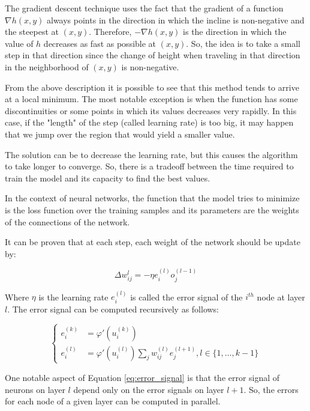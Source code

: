 The gradient descent technique uses the fact that the gradient of a function $\nabla h(x, y)$ always points in the direction in which the incline is non-negative and the steepest at $(x, y)$.
Therefore, $-\nabla h(x,y)$ is the direction in which the value of $h$ decreases as fast as possible at $(x, y)$.
So, the idea is to take a small step in that direction since the change of height when traveling in that direction in the neighborhood of $(x, y)$ is non-negative.

From the above description it is possible to see that this method tends to arrive at a local minimum.
The most notable exception is when the function has some discontinuities or some points in which its values decreases very rapidly.
In this case, if the "length" of the step (called learning rate) is too big, it may happen that we jump over the region that would yield a smaller value.

The solution can be to decrease the learning rate, but this causes the algorithm to take longer to converge.
So, there is a tradeoff between the time required to train the model and its capacity to find the best values.

In the context of neural networks, the function that the model tries to minimize is the loss function over the training samples and its parameters are the weights of the connections of the network.

It can be proven \cite{amari1993backpropagation} that at each step, each weight of the network should be update by:


$$
\Delta w_{ij}^{l} = -\eta e_i^{(l)} o_{j}^{(l-1)}
$$

Where $\eta$ is the learning rate $e_i^{(l)}$ is called the error signal of the $i^{th}$ node at layer $l$.
The error signal can be computed recursively as follows:

\begin{equation}\label{eq:error_signal}
\begin{cases}
    e_i^{(k)} &= \varphi '(u_i^{(k)}) \\
    e_i^{(l)} &= \varphi '(u_i^{(l)}) \sum_j w_{ij}^{(l)}e_j^{(l+1)}, l \in \{1,\dots,k-1\}
\end{cases}
\end{equation}

One notable aspect of Equation \ref{eq:error_signal} is that the error signal of neurons on layer $l$ depend only on the error signals on layer $l+1$.
So, the errors for each node of a given layer can be computed in parallel.

